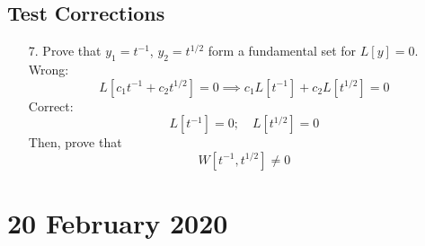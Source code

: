 \documentclass[twoside]{report}
\begin{document}
    \section{Test Corrections}
    \begin{enumerate}
        \item[7.] Prove that $y_{1} = t^{-1}$, $y_{2} = t^{1/2}$ form a fundamental set for $L[y] = 0$.
        Wrong:
        \begin{equation}
            L[c_{1}t^{-1} + c_{2}t^{1/2}] = 0 \implies c_{1}L[t^{-1}] + c_{2}L[t^{1/2}] = 0
        \end{equation}
        Correct:
        \begin{equation}
            L[t^{-1}] = 0;\quad L[t^{1/2}] = 0
        \end{equation}
        Then, prove that
        \begin{equation}
            W[t^{-1}, t^{1/2}] \neq 0
        \end{equation}
    \end{enumerate}
    \chapter{20 February 2020}
\end{document}
